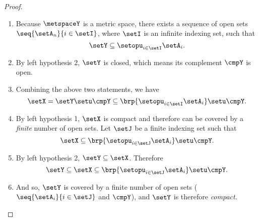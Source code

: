 \begin{proof}

    \begin{enumerate}
      \item Because $\metspaceY$ is a metric space, there exists a 
            sequence of open sets $\seq{\setA_n}{i\in\setI}$,
            where $\setI$ is an infinite indexing set, such that 
              \[ \setY \subseteq \setopu_{i\in\setI} \setA_i. \]
      \item By left hypothesis 2, $\setY$ is closed, which means its complement
            $\cmpY$ is open.
      \item Combining the above two statements, we have 
              \[ \setX = \setY \setu \cmpY \subseteq \brp{\setopu_{i\in\setI} \setA_i}\setu\cmpY. \]
      \item By left hypothesis 1, $\setX$ is compact and therefore can be covered
            by a \emph{finite} number of open sets. 
            Let $\setJ$ be a finite indexing set such that
              \[ \setX \subseteq \brp{\setopu_{i\in\setJ} \setA_i}\setu\cmpY. \]
      \item By left hypothesis 2, $\setY\subseteq\setX$. Therefore
              \[ \setY \subseteq \setX \subseteq \brp{\setopu_{i\in\setJ} \setA_i}\setu\cmpY. \]
      \item And so, $\setY$ is covered by a finite number of open sets 
            ($\seq{\setA_i}{i\in\setJ}$ and $\cmpY$), 
            and $\setY$ is therefore \emph{compact}.
    \end{enumerate}
\end{proof}


